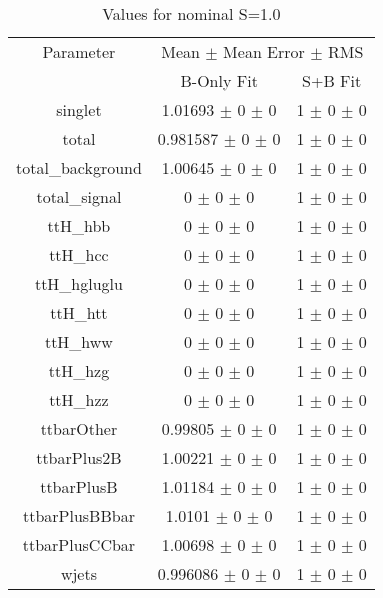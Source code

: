 \begin{table}
\centering
\caption{Values for nominal S=1.0}
\begin{tabular}{ccc}
\toprule
Parameter & \multicolumn{2}{c}{Mean $\pm$ Mean Error $\pm$ RMS}\\
 & B-Only Fit & S+B Fit\\
\midrule
singlet & \num{1.01693} $\pm$ \num{0} $\pm$ \num{0} & \num{1} $\pm$ \num{0} $\pm$ \num{0}\\
total & \num{0.981587} $\pm$ \num{0} $\pm$ \num{0} & \num{1} $\pm$ \num{0} $\pm$ \num{0}\\
total\_background & \num{1.00645} $\pm$ \num{0} $\pm$ \num{0} & \num{1} $\pm$ \num{0} $\pm$ \num{0}\\
total\_signal & \num{0} $\pm$ \num{0} $\pm$ \num{0} & \num{1} $\pm$ \num{0} $\pm$ \num{0}\\
ttH\_hbb & \num{0} $\pm$ \num{0} $\pm$ \num{0} & \num{1} $\pm$ \num{0} $\pm$ \num{0}\\
ttH\_hcc & \num{0} $\pm$ \num{0} $\pm$ \num{0} & \num{1} $\pm$ \num{0} $\pm$ \num{0}\\
ttH\_hgluglu & \num{0} $\pm$ \num{0} $\pm$ \num{0} & \num{1} $\pm$ \num{0} $\pm$ \num{0}\\
ttH\_htt & \num{0} $\pm$ \num{0} $\pm$ \num{0} & \num{1} $\pm$ \num{0} $\pm$ \num{0}\\
ttH\_hww & \num{0} $\pm$ \num{0} $\pm$ \num{0} & \num{1} $\pm$ \num{0} $\pm$ \num{0}\\
ttH\_hzg & \num{0} $\pm$ \num{0} $\pm$ \num{0} & \num{1} $\pm$ \num{0} $\pm$ \num{0}\\
ttH\_hzz & \num{0} $\pm$ \num{0} $\pm$ \num{0} & \num{1} $\pm$ \num{0} $\pm$ \num{0}\\
ttbarOther & \num{0.99805} $\pm$ \num{0} $\pm$ \num{0} & \num{1} $\pm$ \num{0} $\pm$ \num{0}\\
ttbarPlus2B & \num{1.00221} $\pm$ \num{0} $\pm$ \num{0} & \num{1} $\pm$ \num{0} $\pm$ \num{0}\\
ttbarPlusB & \num{1.01184} $\pm$ \num{0} $\pm$ \num{0} & \num{1} $\pm$ \num{0} $\pm$ \num{0}\\
ttbarPlusBBbar & \num{1.0101} $\pm$ \num{0} $\pm$ \num{0} & \num{1} $\pm$ \num{0} $\pm$ \num{0}\\
ttbarPlusCCbar & \num{1.00698} $\pm$ \num{0} $\pm$ \num{0} & \num{1} $\pm$ \num{0} $\pm$ \num{0}\\
wjets & \num{0.996086} $\pm$ \num{0} $\pm$ \num{0} & \num{1} $\pm$ \num{0} $\pm$ \num{0}\\
\bottomrule
\end{tabular}
\end{table}